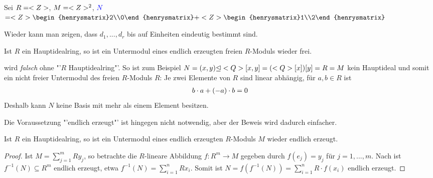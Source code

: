\begin{*example}
	Sei $R=<Z>$, $M=<Z>^2$, \textcolor{blue}{$N$}$=\whole\begin{henrysmatrix}2\\0\end{henrysmatrix}+\whole\begin{henrysmatrix}1\\2\end{henrysmatrix}$
	\begin{center}
	\end{center}
\end{*example}

\begin{remark}
	Wieder kann man zeigen, dass $d_1,...,d_r$ bis auf Einheiten eindeutig bestimmt sind.
\end{remark}

\begin{conclusion}
	Ist $R$ ein Hauptidealring, so ist ein Untermodul eines endlich erzeugten freien $R$-Moduls wieder frei.
\end{conclusion}

\begin{remark}
	 wird \emph{falsch} ohne "'$R$ Hauptidealring"'. So ist zum Beispiel $N=(x,y)\unlhd<Q>[x,y]=(<Q>[x])[y]=R=M$ kein Hauptideal und somit ein nicht freier Untermodul des freien $R$-Moduls $R$: Je zwei Elemente von $R$ sind linear abhängig, für $a,b\in R$ ist
	\begin{align}
		b\cdot a+(-a)\cdot b=0\notag
	\end{align}
	Deshalb kann $N$ keine Basis mit mehr als einem Element besitzen.
	
	Die Voraussetzung "'endlich erzeugt"' ist hingegen nicht notwendig, aber der Beweis wird dadurch einfacher. 
\end{remark}

\begin{conclusion}
	Ist $R$ ein Hauptidealring, so ist ein Untermodul eines endlich erzeugten $R$-Moduls $M$ wieder endlich erzeugt.
\end{conclusion}
\begin{proof}
	Ist $M=\sum_{j=1}^m Ry_j$, so betrachte die $R$-lineare Abbildung $f:R^m\to M$ gegeben durch $f(e_j)=y_j$ für $j=1,...,m$. Nach  ist $f^{-1}(N)\subseteq R^m$ endlich erzeugt, etwa $f^{-1}(N)=\sum_{i=1}^n Rx_i$. Somit ist $N=f(f^{-1}(N))=\sum_{i=1}^n R\cdot f(x_i)$ endlich erzeugt.
\end{proof}

